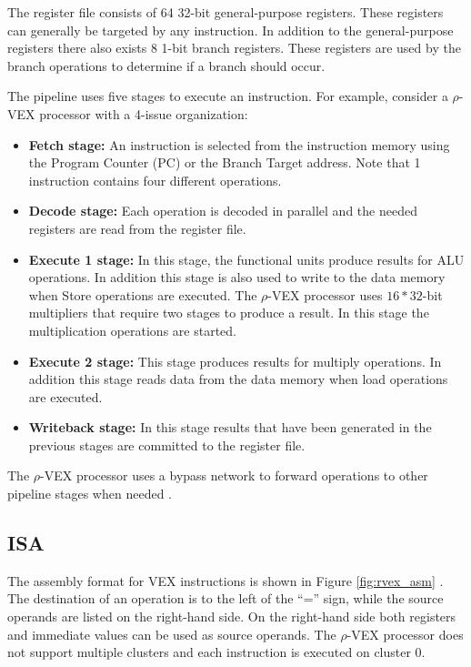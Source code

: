 The register file consists of 64 32-bit general-purpose registers. These registers can generally be targeted by any instruction. In addition to the general-purpose registers there also exists 8 1-bit branch registers. These registers are used by the branch operations to determine if a branch should occur.

The pipeline uses five stages to execute an instruction. For example, consider a $\rho$-VEX processor with a 4-issue organization:

\begin{itemize}
  \item \textbf{Fetch stage:} An instruction is selected from the instruction memory using the Program Counter (PC) or the Branch Target address. Note that 1 instruction contains four different operations.
  \item \textbf{Decode stage:} Each operation is decoded in parallel and the needed registers are read from the register file. 
  \item \textbf{Execute 1 stage:} In this stage, the functional units produce results for ALU operations. In addition this stage is also used to write to the data memory when Store operations are executed. The $\rho$-VEX processor uses $16*32$-bit multipliers that require two stages to produce a result. In this stage the multiplication operations are started.
  \item \textbf{Execute 2 stage:} This stage produces results for multiply operations. In addition this stage reads data from the data memory when load operations are executed.
  \item \textbf{Writeback stage:} In this stage results that have been generated in the previous stages are committed to the register file.
\end{itemize}

The $\rho$-VEX processor uses a bypass network to forward operations to other pipeline stages when needed \cite{Roel-Seedorf:2012qf}.

\subsection{ISA}
The assembly format for VEX instructions is shown in Figure \ref{fig:rvex_asm} \cite{Joseph-A.-Fisher:2012rm}. The destination of an operation is to the left of the ``='' sign, while the source operands are listed on the right-hand side. On the right-hand side both registers and immediate values can be used as source operands. The $\rho$-VEX processor does not support multiple clusters and each instruction is executed on cluster 0.

